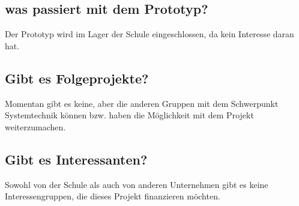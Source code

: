 \subsection{was passiert mit dem Prototyp?}
Der Prototyp wird im Lager der Schule eingeschlossen, da kein Interesse daran hat. 
\subsection{Gibt es Folgeprojekte?}
Momentan gibt es keine, aber die anderen Gruppen mit dem Schwerpunkt Systemtechnik können bzw. haben die Möglichkeit mit dem Projekt weiterzumachen.
\subsection{Gibt es Interessanten?}
Sowohl von der Schule als auch von anderen Unternehmen gibt es keine Interessengruppen, die dieses Projekt finanzieren möchten.